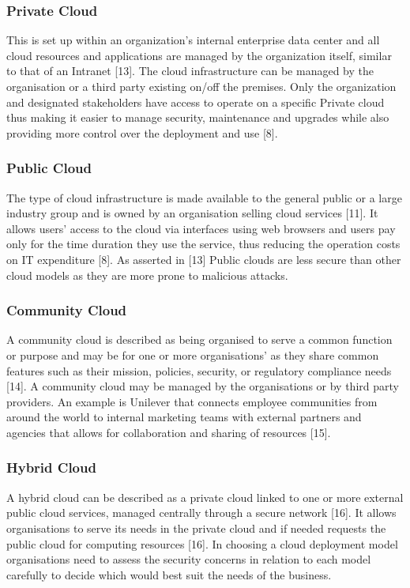 \documentclass[10pt,journal,compsoc]{IEEEtran}
\begin{document}
\subsubsection{ Private Cloud}
\vspace{2mm}
This is set up within an organization’s internal enterprise data center and all cloud resources and applications are managed by the organization itself, similar to that of an Intranet [13]. The cloud infrastructure can be managed by the organisation or a third party existing on/off the premises. Only the organization and designated stakeholders have access to operate on a specific Private cloud thus making it easier to manage security, maintenance and upgrades while also providing more control over the deployment and use [8].

\subsubsection{Public Cloud}
\vspace{2mm}
The type of cloud infrastructure is made available to the general public or a large industry group and is owned by an organisation selling cloud services [11]. It allows users' access to the cloud via interfaces using web browsers and users pay only for the time duration they use the service, thus reducing the operation costs on IT expenditure [8]. As asserted in [13] Public clouds are less secure than other cloud models as they are more prone to malicious attacks.

\subsubsection{Community Cloud}
\vspace{2mm}
A community cloud is described as being organised to serve a common function or purpose and may be for one or more organisations’ as they share common features such as their mission, policies, security, or regulatory compliance needs [14]. A community cloud may be managed by the organisations or by third party providers. An example is Unilever that connects employee communities from around the world to internal marketing teams with external partners and agencies that allows for collaboration and sharing of resources [15].

\subsubsection{Hybrid Cloud}
\vspace{2mm}
A hybrid cloud can be described as a private cloud linked to one or more external public cloud services, managed centrally through a secure network [16]. It allows organisations to serve its needs in the private cloud and if needed requests the public cloud for computing resources [16].  In choosing a cloud deployment model organisations need to assess the security concerns in relation to each model carefully to decide which would best suit the needs of the business.
\end{document}
